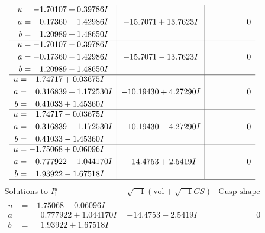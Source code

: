\documentclass[1p]{elsarticle_modified}
\theoremstyle{definition}
\newcommand{\I}{\sqrt{-1}}
\begin{document}
$$\begin{array}{c|c|c}
\begin{aligned}
u &= -1.70107 + 0.39786 I \\
a &= -0.17360 + 1.42986 I \\
b &= \phantom{-}1.20989 + 1.48650 I\end{aligned}
 & -15.7071 + 13.7623 I & \phantom{-0.000000 } 0 \\ \hline\begin{aligned}
u &= -1.70107 - 0.39786 I \\
a &= -0.17360 - 1.42986 I \\
b &= \phantom{-}1.20989 - 1.48650 I\end{aligned}
 & -15.7071 - 13.7623 I & \phantom{-0.000000 } 0 \\ \hline\begin{aligned}
u &= \phantom{-}1.74717 + 0.03675 I \\
a &= \phantom{-}0.316839 + 1.172530 I \\
b &= \phantom{-}0.41033 + 1.45360 I\end{aligned}
 & -10.19430 + 4.27290 I & \phantom{-0.000000 } 0 \\ \hline\begin{aligned}
u &= \phantom{-}1.74717 - 0.03675 I \\
a &= \phantom{-}0.316839 - 1.172530 I \\
b &= \phantom{-}0.41033 - 1.45360 I\end{aligned}
 & -10.19430 - 4.27290 I & \phantom{-0.000000 } 0 \\ \hline\begin{aligned}
u &= -1.75068 + 0.06096 I \\
a &= \phantom{-}0.777922 - 1.044170 I \\
b &= \phantom{-}1.93922 - 1.67518 I\end{aligned}
 & -14.4753 + 2.5419 I & \phantom{-0.000000 } 0\\
 \hline 
 \end{array}$$\newpage$$\begin{array}{c|c|c}  
\text{Solutions to }I^u_{1}& \I (\text{vol} + \sqrt{-1}CS) & \text{Cusp shape}\\
 \hline 
\begin{aligned}
u &= -1.75068 - 0.06096 I \\
a &= \phantom{-}0.777922 + 1.044170 I \\
b &= \phantom{-}1.93922 + 1.67518 I\end{aligned}
 & -14.4753 - 2.5419 I & \phantom{-0.000000 } 0 \\ \hline\begin{aligned}

\end{aligned}
\end{array}$$
\end{document}
